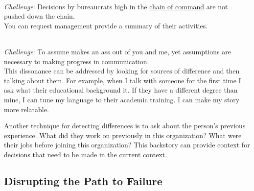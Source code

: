 \ \\
\textit{Challenge}: Decisions by bureaucrats high in the \href{https://en.wikipedia.org/wiki/Command_hierarchy}{chain of command}
are not pushed down the chain. \\
You can request management provide a summary of their activities.

\ \\
\textit{Challenge}: To assume makes an ass out of you and me, 
yet assumptions are necessary to making progress in communication.\\ 
This dissonance can be addressed by looking for sources of difference and then talking about them. For example, when I talk with someone for the first time I ask what their educational background it. If they have a different degree than mine, I can tune my language to their academic training. I can make my story more relatable. 

Another technique for detecting differences is to ask about the person's previous experience. What did they work on previously in this organization? What were their jobs before joining this organization? This backstory can provide context for decisions that need to be made in the current context. 


\subsection*{Disrupting the Path to Failure}


